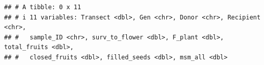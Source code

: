 \documentclass[
]{article}
\newenvironment{Shaded}{\begin{snugshade}}{\end{snugshade}}
\newcommand{\CommentTok}[1]{\textcolor[rgb]{0.56,0.35,0.01}{\textit{#1}}}
\newcommand{\FunctionTok}[1]{\textcolor[rgb]{0.13,0.29,0.53}{\textbf{#1}}}
\newcommand{\NormalTok}[1]{#1}
\newcommand{\OtherTok}[1]{\textcolor[rgb]{0.56,0.35,0.01}{#1}}
\newcommand{\SpecialCharTok}[1]{\textcolor[rgb]{0.81,0.36,0.00}{\textbf{#1}}}
\begin{document}
\begin{verbatim}
## # A tibble: 0 x 11
## # i 11 variables: Transect <dbl>, Gen <chr>, Donor <chr>, Recipient <chr>,
## #   sample_ID <chr>, surv_to_flower <dbl>, F_plant <dbl>, total_fruits <dbl>,
## #   closed_fruits <dbl>, filled_seeds <dbl>, msm_all <dbl>
\end{verbatim}

\begin{Shaded}
\end{Shaded}
\end{document}
